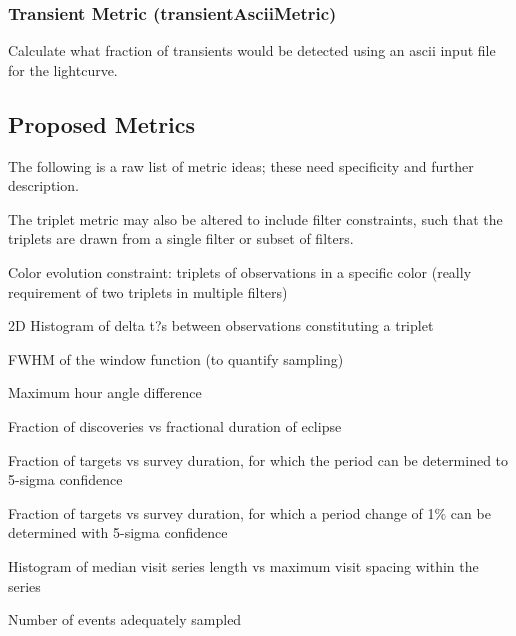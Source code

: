 \subsubsection{Transient Metric (transientAsciiMetric)}

Calculate what fraction of transients would be detected using an ascii input file for the lightcurve.

\subsection{Proposed Metrics}

The following is a raw list of metric ideas; these need specificity and further description. 

The triplet metric may also be altered to include filter constraints, such that the triplets are drawn from a single filter or subset of filters.  

Color evolution constraint: triplets of observations in a specific color (really requirement of two triplets in multiple filters)

  2D Histogram of delta t?s between observations constituting a triplet 

FWHM of the window function (to quantify sampling)

Maximum hour angle difference 

Fraction of discoveries vs fractional duration of eclipse

Fraction of targets vs survey duration, for which the period can be determined to 5-sigma confidence

Fraction of targets vs survey duration, for which a period change of 1$\%$ can be determined with 5-sigma confidence

Histogram of median visit series length vs maximum visit spacing within the series

Number of events adequately sampled














% 


% 




